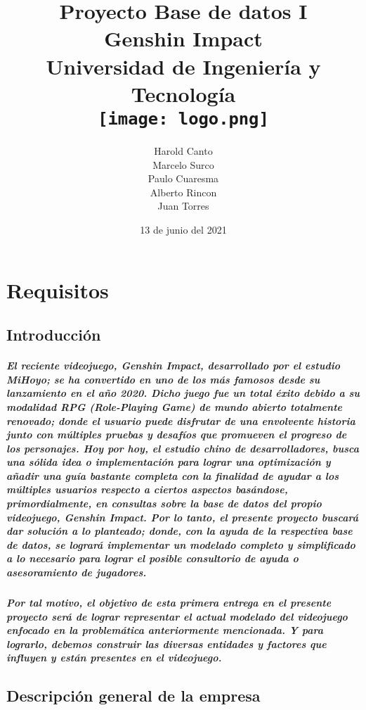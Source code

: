 \documentclass{report}
\title{
{Proyecto Base de datos I\\
Genshin Impact}\\
{\large Universidad de Ingeniería y Tecnología}\\
{\texttt{[image: logo.png]}}
}
\author{
        Harold Canto\\
        Marcelo Surco\\
        Paulo Cuaresma\\
        Alberto Rincon\\
        Juan Torres  
        }
\date{13 de junio del 2021}
\begin{document}
\maketitle

\tableofcontents

\chapter{Requisitos}
\section{Introducción}
\paragraph{El reciente videojuego, Genshin Impact, desarrollado por el estudio MiHoyo; se ha convertido en uno de los más famosos desde su lanzamiento en el año 2020. Dicho juego fue un total éxito debido a su modalidad RPG (Role-Playing Game) de mundo abierto totalmente renovado; donde el usuario puede disfrutar de una envolvente historia junto con múltiples pruebas y desafíos que promueven el progreso de los personajes. Hoy por hoy, el estudio chino de desarrolladores, busca una sólida idea o implementación para lograr una optimización y añadir una guía bastante completa con la finalidad de ayudar a los múltiples usuarios respecto a ciertos aspectos basándose, primordialmente, en consultas sobre la base de datos del propio videojuego, Genshin Impact. Por lo tanto, el presente proyecto buscará dar solución a lo planteado; donde, con la ayuda de la respectiva base de datos, se logrará implementar un modelado completo y simplificado a lo necesario para lograr el posible consultorio de ayuda o asesoramiento de jugadores. }
\paragraph{Por tal motivo, el objetivo de esta primera entrega en el presente proyecto será de lograr representar el actual modelado del videojuego enfocado en la problemática anteriormente mencionada. Y para lograrlo, debemos construir las diversas entidades y factores que influyen y están presentes en el videojuego.}

\section{Descripción general de la empresa}
\end{document}
